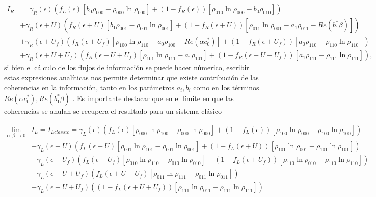 \begin{appendixs}
\begin{align*}
    \dot{I}_{R} &  =  \gamma_{R}(\epsilon)(f_{L}(\epsilon)[b_{0}\rho_{000} - \rho_{000}\ln \rho_{000}] + (1-f_{R}(\epsilon))[\rho_{010}\ln \rho_{000} - b_{0}\rho_{010} ] )  \\ 
      & + \gamma_{R}(\epsilon + U)(f_{R}(\epsilon + U)[b_{1} \rho_{001} - \rho_{001}\ln \rho_{001}] + (1-f_{R}(\epsilon + U))[\rho_{011}\ln \rho_{001} -a_{1}\rho_{011} - Re(b^{*}_{1}\beta ) ]   ) \\  
      & + \gamma_{R}(\epsilon + U_{f})( f_{R}(\epsilon + U_{f})[\rho_{100}\ln \rho_{110} -a_{0}\rho_{100} - Re(\alpha c^{*}_{0}) ]  + (1-f_{R}(\epsilon + U_{f}))[a_{0}\rho_{110} - \rho_{110}\ln \rho_{110} ] ) \\  
      & + \gamma_{R}(\epsilon + U + U_{f})( f_{R}(\epsilon + U + U_{f})[\rho_{101}\ln \rho_{111}- a_{1}\rho_{101}] + (1-f_{R}(\epsilon+U+U_{f}) )[a_{1}\rho_{111} - \rho_{111}\ln \rho_{111}]  ), 
\end{align*}
si bien el cálculo de los flujos de información se puede hacer númerico, escribir estas expresiones analíticas nos permite determinar que existe contribución de las coherencias en la información, tanto en los parámetros $a_{i},b_{i}$ como en los términos $Re(\alpha c^{*}_{0}),Re(b^{*}_{1} \beta)$ . Es importante destacar que en el  límite en que las coherencias se anulan se recupera el resultado para un sistema clásico

\begin{align*}
 \lim_{\alpha,\beta \to 0}  & \dot{I}_{L}  = \dot{I}_{Lclassic}   =  \gamma_{L}(\epsilon)(f_{L}(\epsilon)[\rho_{000}\ln \rho_{100} - \rho_{000}\ln \rho_{000}] + (1-f_{L}(\epsilon))[\rho_{100}\ln \rho_{000} - \rho_{100}\ln \rho_{100} ] )  \\ 
      & + \gamma_{L}(\epsilon + U)(f_{L}(\epsilon + U)[\rho_{001}\ln \rho_{101} - \rho_{001}\ln \rho_{001}] + (1-f_{L}(\epsilon + U))[\rho_{101}\ln \rho_{001} -\rho_{101}\ln \rho_{101} ]   ) \\  
      & + \gamma_{L}(\epsilon + U_{f})( f_{L}(\epsilon + U_{f})[\rho_{010}\ln \rho_{110} -\rho_{010}\ln \rho_{010} ]  + (1-f_{L}(\epsilon + U_{f}))[\rho_{110}\ln \rho_{010} - \rho_{110}\ln \rho_{110} ] ) \\  
      & + \gamma_{L}(\epsilon + U + U_{f})( f_{L}(\epsilon + U + U_{f})[\rho_{011}\ln \rho_{111}- \rho_{011}\ln \rho_{011}]) \\   
      & + \gamma_{L}(\epsilon + U + U_{f})( (1-f_{L}(\epsilon+U+U_{f}) )[\rho_{111}\ln \rho_{011} - \rho_{111}\ln \rho_{111}])   
\end{align*}


\end{appendixs}
